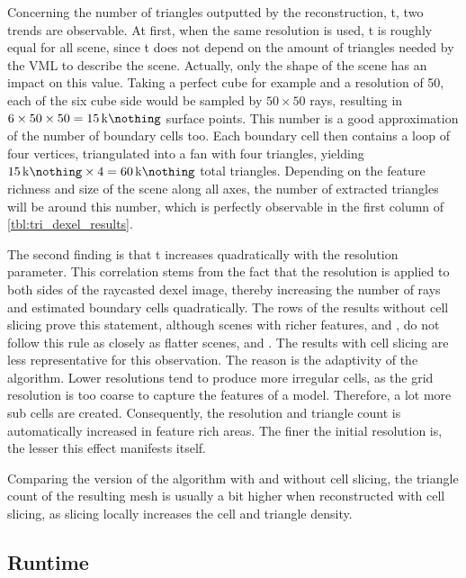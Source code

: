 Concerning the number of triangles outputted by the reconstruction, t, two trends are observable.
At first, when the same resolution is used, t is roughly equal for all scene, since t does not depend on the amount of triangles needed by the VML to describe the scene.
Actually, only the shape of the scene has an impact on this value.
Taking a perfect cube for example and a resolution of 50, each of the six cube side would be sampled by $50\times50$ rays, resulting in $6 \times 50 \times 50 = \SI{15}{\kilo\nothing}$ surface points.
This number is a good approximation of the number of boundary cells too.
Each boundary cell then contains a loop of four vertices, triangulated into a fan with four triangles, yielding $\SI{15}{\kilo\nothing} \times 4 = \SI{60}{\kilo\nothing}$ total triangles.
Depending on the feature richness and size of the scene along all axes, the number of extracted triangles will be around this number, which is perfectly observable in the first column of \cref{tbl:tri_dexel_results}.

The second finding is that t increases quadratically with the resolution parameter.
This correlation stems from the fact that the resolution is applied to both sides of the raycasted dexel image, thereby increasing the number of rays and estimated boundary cells quadratically.
The rows of the results without cell slicing prove this statement, although scenes with richer features, \eg \cylinderhead and \impeller, do not follow this rule as closely as flatter scenes, \eg \cubes and \cylinders.
The results with cell slicing are less representative for this observation.
The reason is the adaptivity of the algorithm.
Lower resolutions tend to produce more irregular cells, as the grid resolution is too coarse to capture the features of a model.
Therefore, a lot more sub cells are created.
Consequently, the resolution and triangle count is automatically increased in feature rich areas.
The finer the initial resolution is, the lesser this effect manifests itself.

Comparing the version of the algorithm with and without cell slicing, the triangle count of the resulting mesh is usually a bit higher when reconstructed with cell slicing, as slicing locally increases the cell and triangle density.


\subsection{Runtime}
\label{sec:tri_dexel_runtime}

